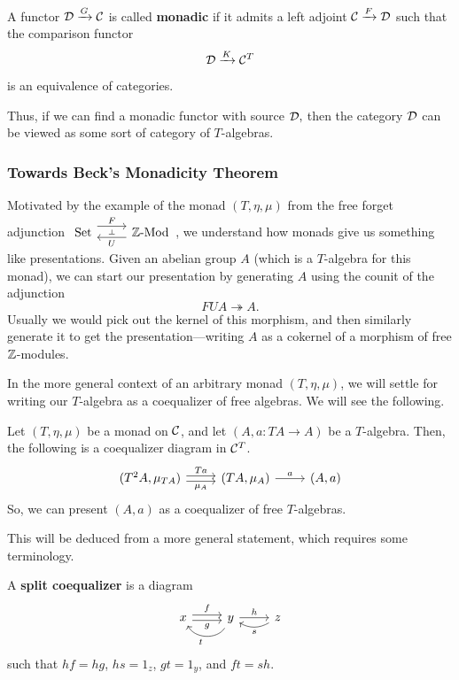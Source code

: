 \documentclass[12pt]{article}
\newcommand{\LMod}{\text{-}\mathrm{Mod}}
\begin{document}
\begin{defn}
    A functor $\mathcal{D} \xrightarrow{G} \mathcal{C}$ is called \textbf{monadic} if it admits a left adjoint $\mathcal{C} \xrightarrow{F} \mathcal{D}$ such that the comparison functor
    \[\mathcal{D} \xrightarrow{K} \mathcal{C}^T\]
    is an equivalence of categories.
\end{defn}

Thus, if we can find a monadic functor with source $\mathcal{D},$ then the category $\mathcal{D}$ can be viewed as some sort of category of $T$-algebras.


\subsubsection{Towards Beck's Monadicity Theorem}

Motivated by the example of the monad $(T,\eta,\mu)$ from the free forget adjunction $\adjunction{\Set}{\Z\LMod}{F}{U}$, we understand how monads give us something like presentations. Given an abelian group $A$ (which is a $T$-algebra for this monad), we can start our presentation by generating $A$ using the counit of the adjunction
\[FU A \twoheadrightarrow A.\]
Usually we would pick out the kernel of this morphism, and then similarly generate it to get the presentation---writing $A$ as a cokernel of a morphism of free $\mathbb{Z}$-modules.

In the more general context of an arbitrary monad $(T,\eta,\mu)$, we will settle for writing our $T$-algebra as a coequalizer of free algebras. We will see the following.

\begin{prop}\label{Prop T-algebras as coequalizers}
    Let $(T,\eta,\mu)$ be a monad on $\mathcal{C}$, and let $(A,a:TA\to A)$ be a $T$-algebra. Then, the following is a coequalizer diagram in $\mathcal{C}^T$.
    \[\begin{tikzcd}
        (T^2 A, \mu_{TA}) \rar[shift left=0.5ex,"Ta"] \rar[shift right=0.5ex, "\mu_A"'] & (TA,\mu_A) \rar["a"] & (A,a)
    \end{tikzcd}\]
    So, we can present $(A,a)$ as a coequalizer of free $T$-algebras.
\end{prop}

This will be deduced from a more general statement, which requires some terminology.

\begin{defn}
    A \textbf{split coequalizer} is a diagram
    \[\begin{tikzcd}
        x \rar[shift left=0.5ex, "f"] \rar[shift right=0.5ex, "g"'] & y \rar["h"] \lar[bend left=60, "t"] & z \lar[bend left, "s"]
    \end{tikzcd}\]
    such that $hf=hg$, $hs=1_z$, $gt=1_y$, and $ft=sh$.
\end{defn}
\end{document}
